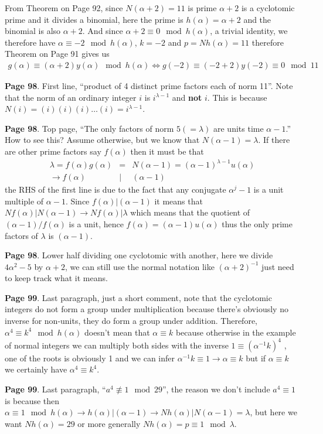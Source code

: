 \documentclass[aps,preprint,preprintnumbers,nofootinbib,showpacs,prd]{revtex4-1}
\newcommand{\nbea}{\begin{eqnarray*}}
\newcommand{\neea}{\end{eqnarray*}}
\begin{document}
From Theorem on Page 92, since $N(\alpha + 2) = 11$ is prime $\alpha + 2$ is a cyclotomic prime and it divides a binomial, here the prime is $h(\alpha) = \alpha + 2$ and the binomial is also $\alpha + 2$. And since $\alpha + 2 \equiv 0 \mod{h(\alpha)}$, a trivial identity, we therefore have $\alpha \equiv -2 \mod{h(\alpha)}$, $k = -2$ and $p = Nh(\alpha) = 11$ therefore Theorem on Page 91 gives us
%
\nbea
g(\alpha) \equiv (\alpha + 2)y(\alpha) \mod{h(\alpha)} \Longleftrightarrow g(-2) \equiv (-2 + 2)y(-2) \equiv 0 \mod{11}
\neea
%

{\bf Page 98}. First line, ``product of 4 distinct prime factors each of norm 11''. Note that the norm of an ordinary integer $i$ is $i^{\lambda-1}$ and {\bf not} $i$. This is because $N(i) = (i)(i)(i)\dots(i) = i^{\lambda-1}$.

{\bf Page 98}. Top page, ``The only factors of norm $5 (= \lambda)$ are units time $\alpha - 1$.'' How to see this? Assume otherwise, but we know that $N(\alpha - 1) = \lambda$. If there are other prime factors say $f(\alpha)$ then it must be that 
%
\nbea
\lambda = f(\alpha) g(\alpha) & = & N(\alpha - 1) = (\alpha - 1)^{\lambda - 1} u(\alpha) \\
\to f(\alpha) & | & (\alpha - 1)
\neea
%
the RHS of the first line is due to the fact that any conjugate $\alpha^j - 1$ is a unit multiple of $\alpha - 1$. Since $f(\alpha) | (\alpha - 1)$ it means that $Nf(\alpha) | N(\alpha - 1) \to Nf(\alpha) | \lambda$ which means that the quotient of $(\alpha - 1)/f(\alpha)$ is a unit, hence $f(\alpha) = (\alpha - 1)u(\alpha)$ thus the only prime factors of $\lambda$ is $(\alpha - 1)$.

{\bf Page 98}. Lower half dividing one cyclotomic with another, here we divide $4\alpha^2 - 5$ by $\alpha + 2$, we can still use the normal notation like $(\alpha + 2)^{-1}$ just need to keep track what it means.

{\bf Page 99}. Last paragraph, just a short comment, note that the cyclotomic integers do not form a group under multiplication because there's obviously no inverse for non-units, they do form a group under addition. Therefore, $\alpha^4 \equiv k^4 \mod{h(\alpha)}$ doesn't mean that $\alpha \equiv k$ because otherwise in the example of normal integers we can multiply both sides with the inverse $1 \equiv (\alpha^{-1} k)^4$ , one of the roots is obviously 1 and we can infer $\alpha^{-1} k \equiv 1 \to \alpha \equiv k$ but if $\alpha \equiv k$ we certainly have $\alpha^4 \equiv k^4$.

{\bf Page 99}. Last paragraph, ``$a^4 \not \equiv 1 \mod{29}$'', the reason we don't include $a^4 \equiv 1$ is because then $\alpha \equiv 1 \mod{h(\alpha)} \to h(\alpha) | (\alpha - 1) \to Nh(\alpha) | N(\alpha - 1) = \lambda$, but here we want $Nh(\alpha) = 29$ or more generally $Nh(\alpha) = p \equiv 1 \mod{\lambda}$.
\end{document}
